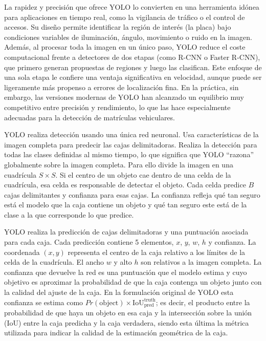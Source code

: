 La rapidez y precisión que ofrece YOLO lo convierten en una herramienta idónea 
para aplicaciones en tiempo real, como la vigilancia de tráfico o el control de accesos.  
Su diseño permite identificar la región de interés (la placa) bajo condiciones variables 
de iluminación, ángulo, movimiento o ruido en la imagen.  
Además, al procesar toda la imagen en un único paso, 
YOLO reduce el coste computacional frente a detectores de dos etapas 
(como R-CNN o Faster R-CNN), que primero generan propuestas de regiones 
y luego las clasifican.  
Este enfoque de una sola etapa le confiere una ventaja significativa en velocidad, 
aunque puede ser ligeramente más propenso a errores de localización fina.  
En la práctica, sin embargo, las versiones modernas de YOLO 
han alcanzado un equilibrio muy competitivo entre precisión y rendimiento, 
lo que las hace especialmente adecuadas para la detección de matrículas vehiculares.

YOLO realiza detección usando una única red neuronal. 
Usa características de la imagen completa para predecir las cajas delimitadoras.
Realiza la detección para todas las clases definidas al mismo tiempo,
lo que significa que YOLO ``razona'' globalmente sobre la imagen completa.
Para ello divide la imagen en una cuadrícula $S\times S$. Si el centro 
de un objeto cae dentro de una celda de la cuadrícula, esa celda
es responsable de detectar el objeto. Cada celda predice $B$ cajas 
delimitantes y confianza para esas cajas. La confianza refleja 
qué tan seguro está el modelo que la caja contiene un objeto y
qué tan seguro este está de la clase a la que corresponde lo que predice. 

YOLO realiza la predicción de cajas delimitadoras y una puntuación asociada para cada caja. 
Cada predicción contiene 5 elementos, $x$, $y$, $w$, $h$ y confianza. 
La coordenada $(x, y)$ representa el centro de la caja relativo a los límites
de la celda de la cuadrícula. El ancho $w$ y alto $h$ son relativos a la imagen completa. 
La confianza que devuelve la red es una puntuación que el modelo estima y cuyo objetivo
es aproximar la probabilidad de que la caja contenga un objeto junto con la calidad del ajuste de la caja. 
En la formulación original de YOLO esta confianza se estima como
$Pr(\text{object}) \times \text{IoU}_{\text{pred}}^{\text{truth}}$; 
es decir, el producto entre la probabilidad de que haya un objeto en esa caja y
la intersección sobre la unión (IoU) entre la caja predicha y la caja verdadera,
siendo esta última la métrica utilizada para indicar la calidad de la estimación geométrica de la caja.

